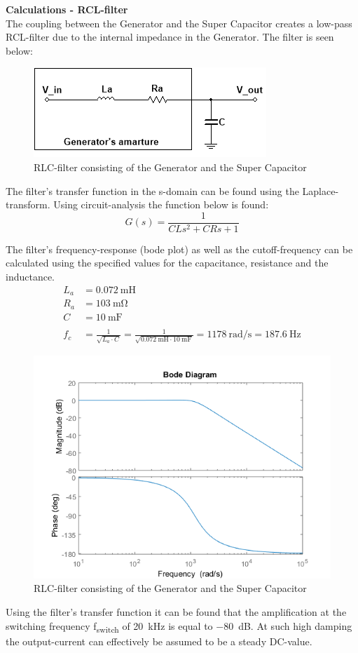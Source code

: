 \textbf{Calculations - RCL-filter}\\
The coupling between the Generator and the Super Capacitor creates a low-pass RCL-filter due to the internal impedance in the Generator. The filter is seen below:

\begin{figure}[H]
	\centering
	\includegraphics[width=0.5\linewidth]{Hardware/LoadSystem/RLC_filter}
	\caption{RLC-filter consisting of the Generator and the Super Capacitor}
	\label{fig:RLC_filter}
\end{figure}

The filter's transfer function in the s-domain can be found using the Laplace-transform. Using circuit-analysis the function below is found: 
\begin{equation}
	G(s) = \frac{1}{CLs^2 + CRs + 1}
\end{equation}

 The filter's frequency-response (bode plot) as well as the cutoff-frequency can be calculated using the specified values for the capacitance, resistance and the inductance.
\begin{equation}
	\begin{split}
		L_a &= \SI{0.072}{\milli \henry}\\
		R_a &= \SI{103}{\milli \ohm}\\
		C &= \SI{10}{\milli \farad}\\
		\\
		f_c &= \frac{1}{\sqrt{L_a \cdot C}} = \frac{1}{\sqrt{\SI{0.072}{\milli \henry} \cdot \SI{10}{\milli \farad}}} = \SI[per-mode=fraction]{1178}{\radian \per \second} = \SI{187.6}{\hertz}
	\end{split}
\end{equation}

\begin{figure}[H]
	\centering
	\includegraphics[width=0.7\linewidth]{Hardware/LoadSystem/BodeFilter}
	\caption{RLC-filter consisting of the Generator and the Super Capacitor}
	\label{fig:RLC_filter}
\end{figure}

Using the filter's transfer function it can be found that the amplification at the switching frequency f\textsubscript{switch} of \SI{20}{\kilo \hertz} is equal to \SI{-80}{dB}. At such high damping the output-current can effectively be assumed to be a steady DC-value.